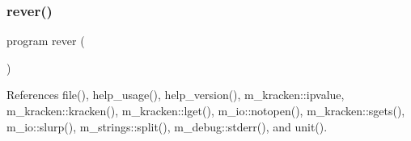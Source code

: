 \subsubsection{\texorpdfstring{rever()}{rever()}}
{\footnotesize\ttfamily program rever (\begin{DoxyParamCaption}{ }\end{DoxyParamCaption})}



References file(), help\+\_\+usage(), help\+\_\+version(), m\+\_\+kracken\+::ipvalue, m\+\_\+kracken\+::kracken(), m\+\_\+kracken\+::lget(), m\+\_\+io\+::notopen(), m\+\_\+kracken\+::sgets(), m\+\_\+io\+::slurp(), m\+\_\+strings\+::split(), m\+\_\+debug\+::stderr(), and unit().

